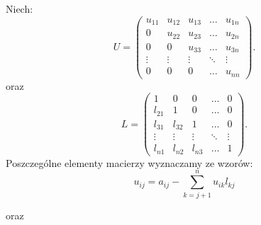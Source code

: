 \documentclass[12pt]{article}
\begin{document}
\noindent Niech:
\[U=\begin{pmatrix}
u_{11} & u_{12} & u_{13} & \ldots & u_{1n} \\
0 & u_{22} & u_{23} & \ldots & u_{2n} \\
0 & 0 & u_{33} & \ldots & u_{3n} \\
\vdots & \vdots & \vdots & \ddots & \vdots \\
0 & 0 & 0 & \ldots & u_{nn}
\end{pmatrix}.
\]
oraz 
\[L=\begin{pmatrix}
1 & 0 & 0 & \ldots & 0 \\
l_{21} & 1 & 0 & \ldots & 0 \\
l_{31} & l_{32} & 1 & \ldots & 0 \\
\vdots & \vdots & \vdots & \ddots & \vdots \\
l_{n1} & l_{n2} & l_{n3} & \ldots & 1
\end{pmatrix}.
\]
Poszczeg\'olne elementy macierzy wyznaczamy ze wzor\'ow:
\begin{equation}
u_{ij}=a_{ij}-\sum_{k=j+1}^n u_{ik}l_{kj} \label{U}
\end{equation}

oraz
 
\end{document}
